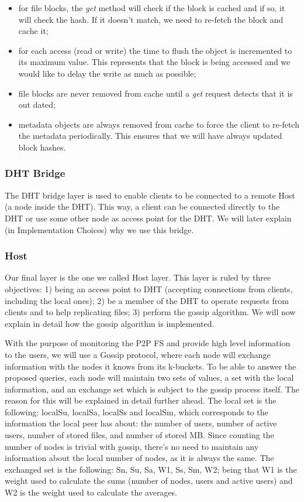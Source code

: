 \documentclass[times,9pt,article]{llncs}
\begin{document}
\begin{itemize}
\item for file blocks, the \emph{get} method will check if the block is cached and if so, it will check the hash. If it doesn't match, we need to re-fetch the block and cache it;
\item for each access (read or write) the time to flush the object is incremented to its maximum value. This represents that the block is being accessed and we would like to delay the write as much as possible;
\item file blocks are never removed from cache until a \emph{get} request detects that it is out dated;
\item metadata objects are always removed from cache to force the client to re-fetch the metadata periodically. This ensures that we will have always updated block hashes.
\end{itemize}

\subsubsection{DHT Bridge}

The DHT bridge layer is used to enable clients to be connected to a remote Host (a node inside the DHT). This way, a client can be connected directly to the DHT or use some other node as access point for the DHT. We will later explain (in Implementation Choices) why we use this bridge.

\subsubsection{Host}
Our final layer is the one we called Host layer. This layer is ruled by three objectives: 1) being an access point to DHT (accepting connections from clients, including the local ones); 2) be a member of the DHT to operate requests from clients and to help replicating files; 3) perform the gossip algorithm. We will now explain in detail how the gossip algorithm is implemented.

With the purpose of monitoring the P2P FS and provide high level information to the users,
we will use a Gossip protocol, where each node will exchange information with the
nodes it knows from its k-buckets.
To be able to answer the proposed queries, each node will maintain two sets of values, a set with the local information, and an exchange set which is subject to the gossip process itself. The reason for this will be explained in detail further ahead. The local set is the following: localSu, localSa, localSs and localSm, which corresponds to the information the local peer has about: the number of users, number of active users, number of stored files, and number of stored MB. Since counting the number of nodes is trivial with gossip, there's no need to maintain any information about the local number of nodes, as it is always the same. The exchanged set is the following: Sn, Su, Sa, W1, Ss, Sm, W2; being that W1 is the weight used to calculate the sums (number of nodes, users and active users) and W2 is the weight used to calculate the averages. 
\end{document}
